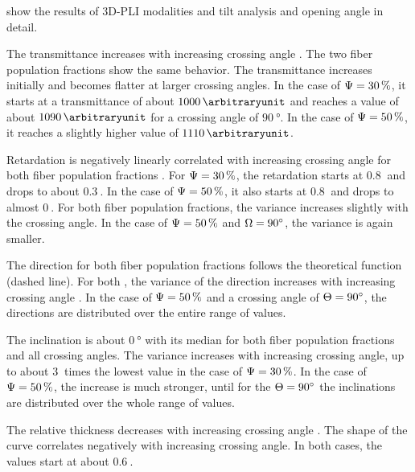 % 
 show the results of \ac{3D-PLI} modalities and tilt analysis and opening angle in detail.
\par
The transmittance increases with increasing crossing angle \modelOmega{}.
The two fiber population fractions \modelPsi{} show the same behavior.
The transmittance increases initially and becomes flatter at larger crossing angles.
In the case of $\textnormal{$\Psi$} = \SI{30}{\percent}$, it starts at a transmittance of about $\SI{1000}{\arbitraryunit}$ and reaches a value of about $\SI{1090}{\arbitraryunit}$ for a crossing angle of $\SI{90}{\degree}$.
In the case of $\textnormal{$\Psi$} = \SI{50}{\percent}$, it reaches a slightly higher value of $\SI{1110}{\arbitraryunit}$.
\par
Retardation is negatively linearly correlated with increasing crossing angle for both fiber population fractions \modelPsi{}.
For $\textnormal{$\Psi$}=\SI{30}{\percent}$, the retardation starts at $\SI{0.8}{}$ and drops to about $\SI{0.3}{}$.
In the case of $\textnormal{$\Psi$}=\SI{50}{\percent}$, it also starts at $\SI{0.8}{}$ and drops to almost $\SI{0}{}$.
For both fiber population fractions, the variance increases slightly with the crossing angle.
In the case of $\textnormal{$\Psi$}=\SI{50}{\percent}$ and $\textnormal{$\Omega$}=\SI{90}{\degree}$, the variance is again smaller.
\par
The direction for both fiber population fractions \modelPsi{} follows the theoretical  function (dashed line).
For both \modelPsi{}, the variance of the direction increases with increasing crossing angle \modelOmega{}.
In the case of $\textnormal{$\Psi$}=\SI{50}{\percent}$ and a crossing angle of $\textnormal{$\Theta$} = \SI{90}{\degree}$, the directions are distributed over the entire range of values.
\par
The inclination is about $\SI{0}{\degree}$ with its median for both fiber population fractions and all crossing angles.
The variance increases with increasing crossing angle, up to about $\SI{3}{}$ times the lowest value in the case of $\textnormal{$\Psi$} = \SI{30}{\percent}$.
In the case of $\textnormal{$\Psi$} = \SI{50}{\percent}$, the increase is much stronger, until for the $\textnormal{$\Theta$}=\SI{90}{\degree}$ the inclinations are distributed over the whole range of values.
\par
The relative thickness \trel{} decreases with increasing crossing angle \modelOmega{}.
The shape of the curve correlates negatively with increasing crossing angle.
In both cases, the \trel{} values start at about $\SI{0.6}{}$.
